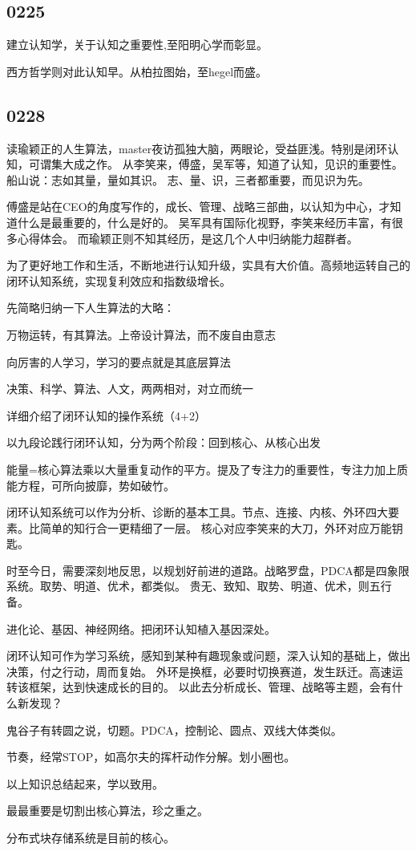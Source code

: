 \subsection{0225}

建立认知学，关于认知之重要性,至阳明心学而彰显。

西方哲学则对此认知早。从柏拉图始，至hegel而盛。

\subsection{0228}

读瑜颖正的人生算法，master夜访孤独大脑，两眼论，受益匪浅。特别是闭环认知，可谓集大成之作。
从李笑来，傅盛，吴军等，知道了认知，见识的重要性。船山说：志如其量，量如其识。
志、量、识，三者都重要，而见识为先。

傅盛是站在CEO的角度写作的，成长、管理、战略三部曲，以认知为中心，才知道什么是最重要的，什么是好的。
吴军具有国际化视野，李笑来经历丰富，有很多心得体会。
而瑜颖正则不知其经历，是这几个人中归纳能力超群者。

为了更好地工作和生活，不断地进行认知升级，实具有大价值。高频地运转自己的闭环认知系统，实现复利效应和指数级增长。

先简略归纳一下人生算法的大略：
\begin{compactenum}
\item 万物运转，有其算法。上帝设计算法，而不废自由意志
\item 向厉害的人学习，学习的要点就是其底层算法
\item 决策、科学、算法、人文，两两相对，对立而统一
\item 详细介绍了闭环认知的操作系统（4+2）
\item 以九段论践行闭环认知，分为两个阶段：回到核心、从核心出发
\end{compactenum}

能量=核心算法乘以大量重复动作的平方。提及了专注力的重要性，专注力加上质能方程，可所向披靡，势如破竹。

闭环认知系统可以作为分析、诊断的基本工具。节点、连接、内核、外环四大要素。比简单的知行合一更精细了一层。
核心对应李笑来的大刀，外环对应万能钥匙。

时至今日，需要深刻地反思，以规划好前进的道路。战略罗盘，PDCA都是四象限系统。取势、明道、优术，都类似。
贵无、致知、取势、明道、优术，则五行备。

进化论、基因、神经网络。把闭环认知植入基因深处。

闭环认知可作为学习系统，感知到某种有趣现象或问题，深入认知的基础上，做出决策，付之行动，周而复始。
外环是换框，必要时切换赛道，发生跃迁。高速运转该框架，达到快速成长的目的。
以此去分析成长、管理、战略等主题，会有什么新发现？

鬼谷子有转圆之说，切题。PDCA，控制论、圆点、双线大体类似。

节奏，经常STOP，如高尔夫的挥杆动作分解。划小圈也。

以上知识总结起来，学以致用。

最最重要是切割出核心算法，珍之重之。

分布式块存储系统是目前的核心。
